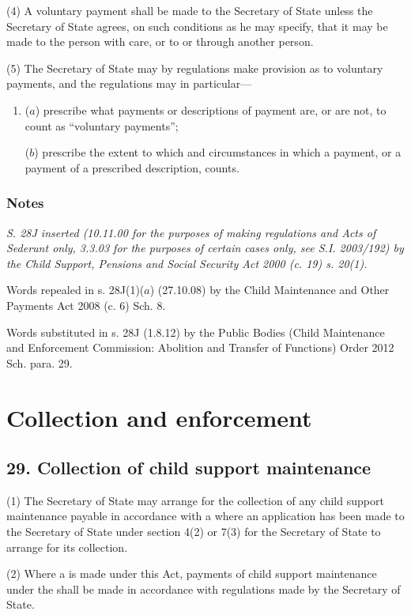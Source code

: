 \documentclass[a4paper]{article}
\newcommand\amendment[1]{\subsubsection*{Notes}{\itshape\frenchspacing\footnotesize #1 \par}}
\begin{document}
{(4)
A voluntary payment shall be made to the Secretary of State unless the Secretary of State agrees, on such conditions as he may specify, that it may be made to the person with care, or to or through another person.

(5)
The Secretary of State may by regulations make provision as to voluntary payments, and the regulations may in particular---
\begin{enumerate}\item[]
($a$) prescribe what payments or descriptions of payment are, or are not, to count as “voluntary payments”;

($b$) prescribe the extent to which and circumstances in which a payment, or a payment of a prescribed description, counts.
\end{enumerate}

\amendment{
S. 28J inserted (10.11.00 for the purposes of making regulations and Acts of Sederunt only, 3.3.03 for the purposes of certain cases only, see S.I. 2003/192) by the Child Support, Pensions and Social Security Act 2000 (c. 19) s. 20(1).

Words repealed in s. 28J(1)($a$) (27.10.08) by the Child Maintenance and Other Payments Act 2008 (c. 6) Sch. 8.

Words substituted in s. 28J (1.8.12) by the Public Bodies (Child Maintenance and Enforcement Commission: Abolition and Transfer of Functions) Order 2012 Sch. para. 29.
}
}

\section{Collection and enforcement}

\subsection{29. Collection of child support maintenance}

(1) The Secretary of State may arrange for the collection of any child support maintenance payable in accordance with a  where
an application has been made to the Secretary of State under section 4(2)
or 7(3) for the Secretary of State to arrange for its collection.

(2) Where a  is made under this Act, payments of child support maintenance under the  shall be made in accordance with regulations made by the Secretary of State.
\end{document}

